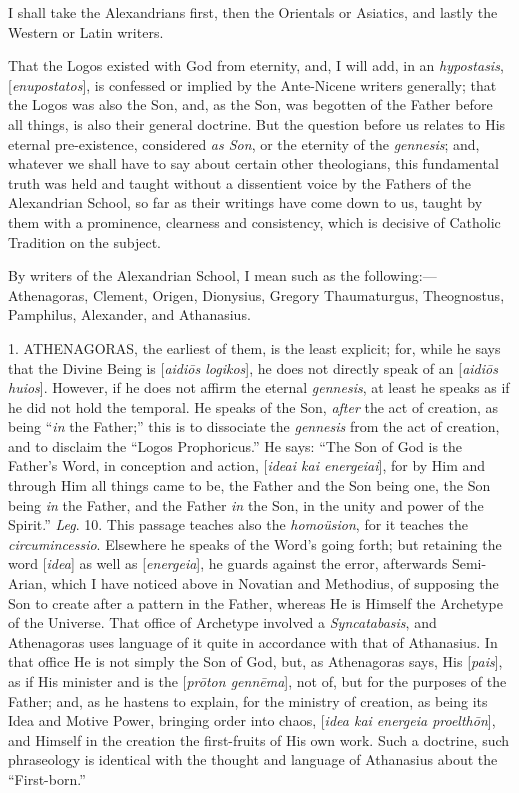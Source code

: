 I shall take the Alexandrians first, then the Orientals or Asiatics,
and lastly the Western or Latin writers.


That the Logos existed with God from eternity, and, I will
add, in an \emph{hypostasis}, [\emph{enupostatos}], is confessed or
implied by the Ante-Nicene writers generally; that the Logos was also
the Son, and, as the Son, was begotten of the Father before all
things, is also their general doctrine. But the question before us
relates to His eternal pre-existence, considered \emph{as Son}, or the
eternity of the \emph{gennesis}; and, whatever we shall have to say
about certain other theologians, this fundamental truth was held and
taught without a dissentient voice by the Fathers of the Alexandrian
School, so far as their writings have come down to us, taught by them
with a prominence, clearness and consistency, which is decisive of
Catholic Tradition on the subject.

By writers of the Alexandrian School, I mean such as the following:—Athenagoras,
Clement, Origen, Dionysius, Gregory Thaumaturgus, Theognostus,
Pamphilus, Alexander, and Athanasius.

1. ATHENAGORAS, the earliest of them, is the
least explicit; for, while he says that the Divine Being is [\emph{aidi\={o}s
logikos}], he does not directly speak of an [\emph{aidi\={o}s huios}].
However, if he does not affirm the eternal \emph{gennesis}, at least
he speaks as if he did not hold the temporal. He speaks of the Son, \emph{after}
the act of creation, as being ``\emph{in} the Father;'' this
is to dissociate the \emph{gennesis} from the act of creation, and to
disclaim the ``Logos Prophoricus.'' He says: ``The
Son of God is the Father's Word, in conception and action, [\emph{ideai
kai energeiai}], for by Him and through Him all things came to be,
the Father and the Son being one, the Son being \emph{in} the Father,
and the Father \emph{in} the Son, in the unity and power of the
Spirit.'' \emph{Leg}. 10. This passage teaches also the \emph{homoüsion},
for it teaches the \emph{circumincessio}. Elsewhere he speaks of the
Word's going forth; but retaining the word [\emph{idea}] as well as [\emph{energeia}],
he guards against the error, afterwards Semi-Arian, which I have
noticed above in Novatian and Methodius, of supposing the Son to
create after a pattern in the Father, whereas He is Himself the
Archetype of the Universe. That office of Archetype involved a \emph{Syncatabasis},
and Athenagoras uses language of it quite in accordance with that of
Athanasius. In that office He is not simply the Son of God, but, as
Athenagoras says, His [\emph{pais}], as if His minister and is the [\emph{pr\={o}ton
genn\={e}ma}], not of, but for the purposes of the Father; and,
as he hastens to explain, for the ministry of creation, as being its
Idea and Motive Power, bringing order into chaos, [\emph{idea kai
energeia proelth\={o}n}], and Himself in the creation the
first-fruits of His own work. Such a doctrine, such phraseology is
identical with the thought and language of Athanasius about the
``First-born.''

